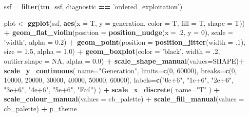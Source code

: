 \documentclass[]{book}
\newenvironment{Shaded}{\begin{snugshade}}{\end{snugshade}}
\newcommand{\DataTypeTok}[1]{\textcolor[rgb]{0.13,0.29,0.53}{#1}}
\newcommand{\DecValTok}[1]{\textcolor[rgb]{0.00,0.00,0.81}{#1}}
\newcommand{\FloatTok}[1]{\textcolor[rgb]{0.00,0.00,0.81}{#1}}
\newcommand{\KeywordTok}[1]{\textcolor[rgb]{0.13,0.29,0.53}{\textbf{#1}}}
\newcommand{\NormalTok}[1]{#1}
\newcommand{\OperatorTok}[1]{\textcolor[rgb]{0.81,0.36,0.00}{\textbf{#1}}}
\newcommand{\OtherTok}[1]{\textcolor[rgb]{0.56,0.35,0.01}{#1}}
\newcommand{\StringTok}[1]{\textcolor[rgb]{0.31,0.60,0.02}{#1}}
\begin{document}
\begin{Shaded}
\begin{Highlighting}[]
\NormalTok{ssf =}\StringTok{ }\KeywordTok{filter}\NormalTok{(tru_ssf, diagnostic }\OperatorTok{==}\StringTok{ 'ordered_exploitation'}\NormalTok{)}

\NormalTok{plot <-}\StringTok{ }\KeywordTok{ggplot}\NormalTok{(ssf, }\KeywordTok{aes}\NormalTok{(}\DataTypeTok{x =}\NormalTok{ T, }\DataTypeTok{y =}\NormalTok{ generation, }\DataTypeTok{color =}\NormalTok{ T, }\DataTypeTok{fill =}\NormalTok{ T, }\DataTypeTok{shape =}\NormalTok{ T)) }\OperatorTok{+}
\StringTok{  }\KeywordTok{geom_flat_violin}\NormalTok{(}\DataTypeTok{position =} \KeywordTok{position_nudge}\NormalTok{(}\DataTypeTok{x =} \FloatTok{.2}\NormalTok{, }\DataTypeTok{y =} \DecValTok{0}\NormalTok{), }\DataTypeTok{scale =} \StringTok{'width'}\NormalTok{, }\DataTypeTok{alpha =} \FloatTok{0.2}\NormalTok{) }\OperatorTok{+}
\StringTok{  }\KeywordTok{geom_point}\NormalTok{(}\DataTypeTok{position =} \KeywordTok{position_jitter}\NormalTok{(}\DataTypeTok{width =} \FloatTok{.1}\NormalTok{), }\DataTypeTok{size =} \FloatTok{1.5}\NormalTok{, }\DataTypeTok{alpha =} \FloatTok{1.0}\NormalTok{) }\OperatorTok{+}
\StringTok{  }\KeywordTok{geom_boxplot}\NormalTok{(}\DataTypeTok{color =} \StringTok{'black'}\NormalTok{, }\DataTypeTok{width =} \FloatTok{.2}\NormalTok{, }\DataTypeTok{outlier.shape =} \OtherTok{NA}\NormalTok{, }\DataTypeTok{alpha =} \FloatTok{0.0}\NormalTok{) }\OperatorTok{+}
\StringTok{  }\KeywordTok{scale_shape_manual}\NormalTok{(}\DataTypeTok{values=}\NormalTok{SHAPE)}\OperatorTok{+}
\StringTok{  }\KeywordTok{scale_y_continuous}\NormalTok{(}
    \DataTypeTok{name=}\StringTok{"Generation"}\NormalTok{,}
    \DataTypeTok{limits=}\KeywordTok{c}\NormalTok{(}\DecValTok{0}\NormalTok{, }\DecValTok{60000}\NormalTok{),}
    \DataTypeTok{breaks=}\KeywordTok{c}\NormalTok{(}\DecValTok{0}\NormalTok{, }\DecValTok{10000}\NormalTok{, }\DecValTok{20000}\NormalTok{, }\DecValTok{30000}\NormalTok{, }\DecValTok{40000}\NormalTok{, }\DecValTok{50000}\NormalTok{, }\DecValTok{60000}\NormalTok{),}
    \DataTypeTok{labels=}\KeywordTok{c}\NormalTok{(}\StringTok{"0e+6"}\NormalTok{, }\StringTok{"1e+6"}\NormalTok{, }\StringTok{"2e+6"}\NormalTok{, }\StringTok{"3e+6"}\NormalTok{, }\StringTok{"4e+6"}\NormalTok{, }\StringTok{"5e+6"}\NormalTok{, }\StringTok{"Fail"}\NormalTok{)}
\NormalTok{  ) }\OperatorTok{+}
\StringTok{  }\KeywordTok{scale_x_discrete}\NormalTok{(}
    \DataTypeTok{name=}\StringTok{"T"}
\NormalTok{  ) }\OperatorTok{+}
\StringTok{  }\KeywordTok{scale_colour_manual}\NormalTok{(}\DataTypeTok{values =}\NormalTok{ cb_palette) }\OperatorTok{+}
\StringTok{  }\KeywordTok{scale_fill_manual}\NormalTok{(}\DataTypeTok{values =}\NormalTok{ cb_palette) }\OperatorTok{+}
\StringTok{  }\NormalTok{p_theme}


\end{Highlighting}
\end{Shaded}
\end{document}

